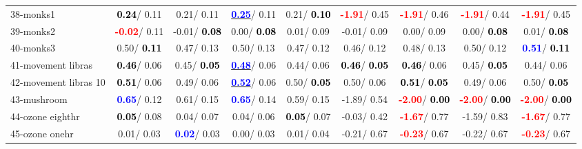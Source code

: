 \begin{table}[h]
\begin{center}
\begin{tabular}{lc|c|c|c|c|c|c|c}
38-monks1 & \textcolor{black}{\textbf{  0.24}}/  0.11 &   0.21/  0.11 & \underline{\textcolor{blue}{\textbf{  0.25}}}/  0.11 &   0.21/\textcolor{black}{\textbf{  0.10}} & \textcolor{red}{\textbf{ -1.91}}/  0.45 & \textcolor{red}{\textbf{ -1.91}}/  0.46 & \textcolor{red}{\textbf{ -1.91}}/  0.44 & \textcolor{red}{\textbf{ -1.91}}/  0.45 \\
39-monks2 & \textcolor{red}{\textbf{ -0.02}}/  0.11 &  -0.01/\textcolor{black}{\textbf{  0.08}} &   0.00/\textcolor{black}{\textbf{  0.08}} &   0.01/  0.09 &  -0.01/  0.09 &   0.00/  0.09 &   0.00/\textcolor{black}{\textbf{  0.08}} &   0.01/\textcolor{black}{\textbf{  0.08}} \\ \hline
40-monks3 &   0.50/\textcolor{black}{\textbf{  0.11}} &   0.47/  0.13 &   0.50/  0.13 &   0.47/  0.12 &   0.46/  0.12 &   0.48/  0.13 &   0.50/  0.12 & \textcolor{blue}{\textbf{  0.51}}/\textcolor{black}{\textbf{  0.11}} \\
41-movement libras & \textcolor{black}{\textbf{  0.46}}/  0.06 &   0.45/\textcolor{black}{\textbf{  0.05}} & \underline{\textcolor{blue}{\textbf{  0.48}}}/  0.06 &   0.44/  0.06 & \textcolor{black}{\textbf{  0.46}}/\textcolor{black}{\textbf{  0.05}} & \textcolor{black}{\textbf{  0.46}}/  0.06 &   0.45/\textcolor{black}{\textbf{  0.05}} &   0.44/  0.06 \\
42-movement libras 10 & \textcolor{black}{\textbf{  0.51}}/  0.06 &   0.49/  0.06 & \underline{\textcolor{blue}{\textbf{  0.52}}}/  0.06 &   0.50/\textcolor{black}{\textbf{  0.05}} &   0.50/  0.06 & \textcolor{black}{\textbf{  0.51}}/\textcolor{black}{\textbf{  0.05}} &   0.49/  0.06 &   0.50/\textcolor{black}{\textbf{  0.05}} \\
43-mushroom & \textcolor{blue}{\textbf{  0.65}}/  0.12 &   0.61/  0.15 & \textcolor{blue}{\textbf{  0.65}}/  0.14 &   0.59/  0.15 &  -1.89/  0.54 & \textcolor{red}{\textbf{ -2.00}}/\textcolor{black}{\textbf{  0.00}} & \textcolor{red}{\textbf{ -2.00}}/\textcolor{black}{\textbf{  0.00}} & \textcolor{red}{\textbf{ -2.00}}/\textcolor{black}{\textbf{  0.00}} \\
44-ozone eighthr & \textcolor{black}{\textbf{  0.05}}/  0.08 &   0.04/  0.07 &   0.04/  0.06 & \textcolor{black}{\textbf{  0.05}}/  0.07 &  -0.03/  0.42 & \textcolor{red}{\textbf{ -1.67}}/  0.77 &  -1.59/  0.83 & \textcolor{red}{\textbf{ -1.67}}/  0.77 \\
45-ozone onehr &   0.01/  0.03 & \textcolor{blue}{\textbf{  0.02}}/  0.03 &   0.00/  0.03 &   0.01/  0.04 &  -0.21/  0.67 & \textcolor{red}{\textbf{ -0.23}}/  0.67 &  -0.22/  0.67 & \textcolor{red}{\textbf{ -0.23}}/  0.67 \\

\end{tabular}
\end{center}
\end{table}
